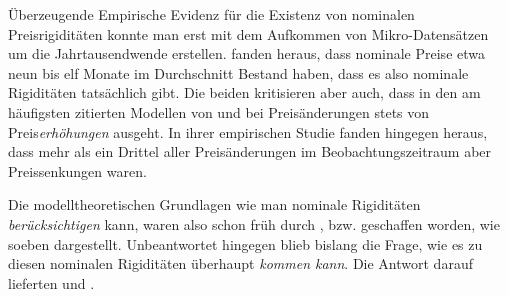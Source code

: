 Überzeugende Empirische Evidenz für die Existenz von nominalen Preisrigiditäten konnte man erst mit dem Aufkommen von Mikro-Datensätzen um die Jahrtausendwende erstellen. \textcite{Nakamura2008} fanden heraus, dass nominale Preise etwa neun bis elf Monate im Durchschnitt Bestand haben, dass es also nominale Rigiditäten tatsächlich gibt. Die beiden kritisieren aber auch, dass in den am häufigsten zitierten Modellen von \textcite{Taylor1980} und \textcite{Calvo1983} bei Preisänderungen stets von Preis\textit{erhöhungen} ausgeht. In ihrer empirischen Studie fanden \textcite[S. 1442]{Nakamura2008} hingegen heraus, dass mehr als ein Drittel aller Preisänderungen im Beobachtungszeitraum aber Preissenkungen waren.


Die modelltheoretischen Grundlagen wie man nominale Rigiditäten \textit{berücksichtigen} kann, waren also schon früh durch \textcite{Taylor1977, Fischer1977}, bzw. \textcite{Calvo1983} geschaffen worden, wie soeben dargestellt. Unbeantwortet hingegen blieb bislang die Frage, wie es zu diesen nominalen Rigiditäten überhaupt \textit{kommen kann}. Die Antwort darauf lieferten \textcite{Mankiw1985b, Akerlof1985, Parkin1986, RomerDavid1990} und \textcite{Ball1988}. 

